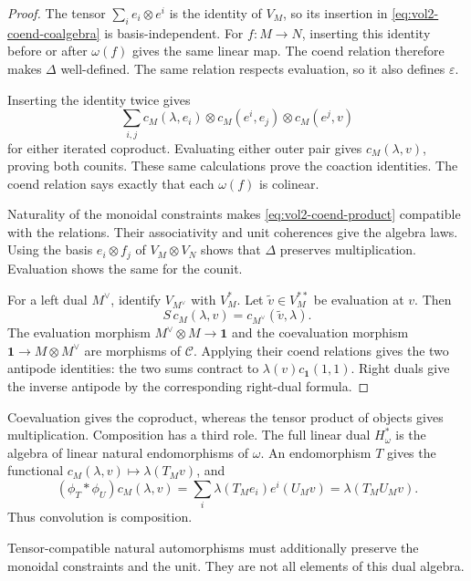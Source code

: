 \begin{proof}
The tensor $\sum_i e_i\otimes e^i$ is the identity of $V_M$,
so its insertion in \eqref{eq:vol2-coend-coalgebra} is
basis-independent.
For $f:M\to N$, inserting this identity before or after $\omega(f)$
gives the same linear map.
The coend relation therefore makes $\Delta$ well-defined.
The same relation respects evaluation, so it also defines
$\varepsilon$.

Inserting the identity twice gives
\[
 \sum_{i,j}
 c_M(\lambda,e_i)\otimes
 c_M(e^i,e_j)\otimes
 c_M(e^j,v)
\]
for either iterated coproduct.
Evaluating either outer pair gives $c_M(\lambda,v)$, proving
both counits.
These same calculations prove the coaction identities.
The coend relation says exactly that each $\omega(f)$ is
colinear.

Naturality of the monoidal constraints makes
\eqref{eq:vol2-coend-product} compatible with the relations.
Their associativity and unit coherences give the algebra laws.
Using the basis $e_i\otimes f_j$ of $V_M\otimes V_N$ shows
that $\Delta$ preserves multiplication. Evaluation shows the
same for the counit.

For a left dual $M^\vee$, identify $V_{M^\vee}$ with $V_M^*$.
Let $\widetilde v\in V_M^{**}$ be evaluation at $v$.
Then
\[
 S\,c_M(\lambda,v)=c_{M^\vee}(\widetilde v,\lambda).
\]
The evaluation morphism $M^\vee\otimes M\to\mathbf1$ and the
coevaluation morphism $\mathbf1\to M\otimes M^\vee$ are
morphisms of $\mathcal C$.
Applying their coend relations gives the two antipode identities:
the two sums contract to $\lambda(v)c_{\mathbf1}(1,1)$.
Right duals give the inverse antipode by the corresponding
right-dual formula.
\end{proof}

Coevaluation gives the coproduct, whereas the tensor product of
objects gives multiplication.
Composition has a third role.
The full linear dual $H_\omega^*$ is the algebra of linear natural
endomorphisms of $\omega$.
An endomorphism $T$ gives the functional
$c_M(\lambda,v)\mapsto\lambda(T_Mv)$, and
\[
 (\phi_T*\phi_U)c_M(\lambda,v)
   =\sum_i\lambda(T_Me_i)e^i(U_Mv)
   =\lambda(T_MU_Mv).
\]
Thus convolution is composition.

Tensor-compatible natural automorphisms must additionally preserve
the monoidal constraints and the unit.
They are not all elements of this dual algebra.

